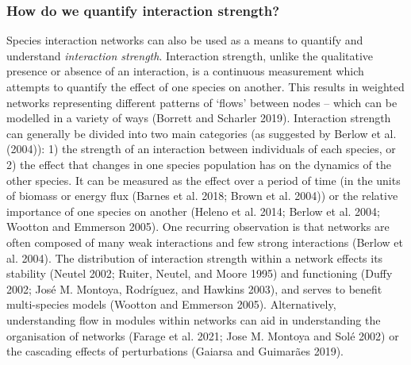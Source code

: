 \documentclass[10pt,oneside]{article}
\begin{document}
\hypertarget{how-do-we-quantify-interaction-strength}{%
\subsubsection{How do we quantify interaction
strength?}\label{how-do-we-quantify-interaction-strength}}

Species interaction networks can also be used as a means to quantify and
understand \emph{interaction strength}. Interaction strength, unlike the
qualitative presence or absence of an interaction, is a continuous
measurement which attempts to quantify the effect of one species on
another. This results in weighted networks representing different
patterns of `flows' between nodes -- which can be modelled in a variety
of ways (Borrett and Scharler 2019). Interaction strength can generally
be divided into two main categories (as suggested by Berlow et al.
(2004)): 1) the strength of an interaction between individuals of each
species, or 2) the effect that changes in one species population has on
the dynamics of the other species. It can be measured as the effect over
a period of time (in the units of biomass or energy flux (Barnes et al.
2018; Brown et al. 2004)) or the relative importance of one species on
another (Heleno et al. 2014; Berlow et al. 2004; Wootton and Emmerson
2005). One recurring observation is that networks are often composed of
many weak interactions and few strong interactions (Berlow et al. 2004).
The distribution of interaction strength within a network effects its
stability (Neutel 2002; Ruiter, Neutel, and Moore 1995) and functioning
(Duffy 2002; José M. Montoya, Rodríguez, and Hawkins 2003), and serves
to benefit multi-species models (Wootton and Emmerson 2005).
Alternatively, understanding flow in modules within networks can aid in
understanding the organisation of networks (Farage et al. 2021; Jose M.
Montoya and Solé 2002) or the cascading effects of perturbations
(Gaiarsa and Guimarães 2019).
\end{document}
